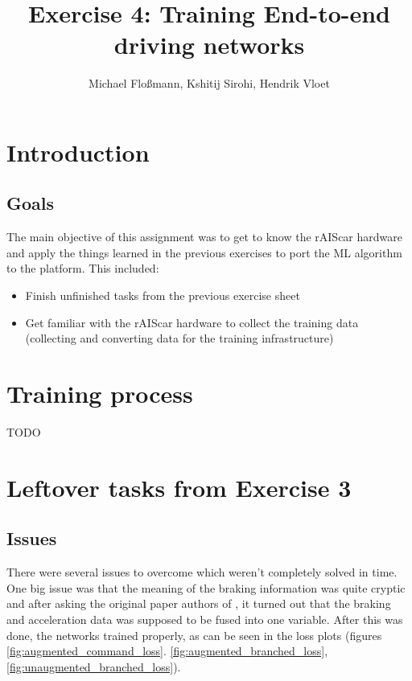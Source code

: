 \documentclass[a4paper]{article}
\title{Exercise 4: Training End-to-end driving networks}
\author{Michael Floßmann, Kshitij Sirohi, Hendrik Vloet}
\begin{document}
\maketitle

\section{Introduction}
\subsection{Goals}
The main objective of this assignment was to get to know the rAIScar hardware
and apply the things learned in the previous exercises to port the ML algorithm
to the platform. This included:
\begin{itemize}
\item Finish unfinished tasks from the previous exercise sheet
\item Get familiar with the rAIScar hardware to collect the training data
  (collecting and converting data for the training infrastructure)
\end{itemize} 

\section{Training process}
TODO

\section{Leftover tasks from Exercise 3}

\subsection{Issues}
There were several issues to overcome which weren't completely solved in time.
One big issue was that the meaning of the braking information was quite cryptic
and after asking the original paper authors of \cite{imitation}, it turned out
that the braking and acceleration data was supposed to be fused into one
variable. After this was done, the networks trained properly, as can be seen in
the loss plots (figures \ref{fig:augmented_command_loss}.
\ref{fig:augmented_branched_loss}, \ref{fig:unaugmented_branched_loss}).
\end{document}
